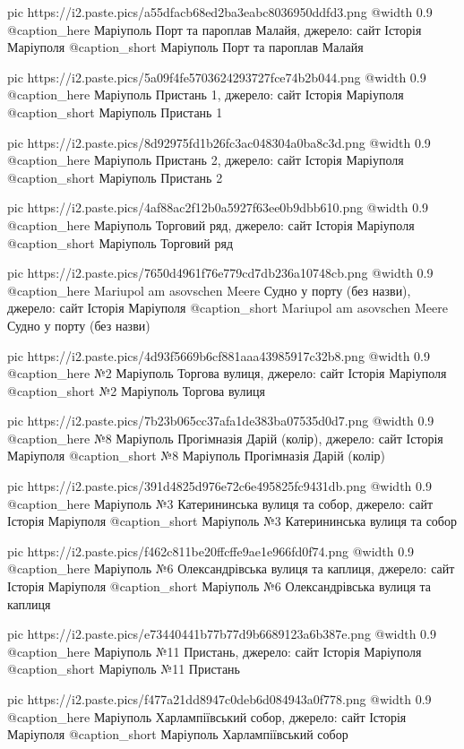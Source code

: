 	pic https://i2.paste.pics/a55dfacb68ed2ba3eabc8036950ddfd3.png
	@width 0.9
	@caption_here Маріуполь Порт та пароплав Малайя, джерело: сайт Історія Маріуполя
	@caption_short Маріуполь Порт та пароплав Малайя

	pic https://i2.paste.pics/5a09f4fe5703624293727fce74b2b044.png
	@width 0.9
	@caption_here Маріуполь Пристань 1, джерело: сайт Історія Маріуполя
	@caption_short Маріуполь Пристань 1

	pic https://i2.paste.pics/8d92975fd1b26fc3ac048304a0ba8c3d.png
	@width 0.9
	@caption_here Маріуполь Пристань 2, джерело: сайт Історія Маріуполя
	@caption_short Маріуполь Пристань 2

	pic https://i2.paste.pics/4af88ac2f12b0a5927f63ee0b9dbb610.png
	@width 0.9
	@caption_here Маріуполь Торговий ряд, джерело: сайт Історія Маріуполя
	@caption_short Маріуполь Торговий ряд

	pic https://i2.paste.pics/7650d4961f76e779cd7db236a10748cb.png
	@width 0.9
	@caption_here Mariupol am asovschen Meere Судно у порту (без назви), джерело: сайт Історія Маріуполя
	@caption_short Mariupol am asovschen Meere Судно у порту (без назви)

	pic https://i2.paste.pics/4d93f5669b6cf881aaa43985917c32b8.png
	@width 0.9
	@caption_here №2 Маріуполь Торгова вулиця, джерело: сайт Історія Маріуполя
	@caption_short №2 Маріуполь Торгова вулиця

	pic https://i2.paste.pics/7b23b065cc37afa1de383ba07535d0d7.png
	@width 0.9
	@caption_here №8 Маріуполь Прогімназія Дарій (колір), джерело: сайт Історія Маріуполя
	@caption_short №8 Маріуполь Прогімназія Дарій (колір)

	pic https://i2.paste.pics/391d4825d976e72c6e495825fc9431db.png
	@width 0.9
	@caption_here Маріуполь №3 Катерининська вулиця та собор, джерело: сайт Історія Маріуполя
	@caption_short Маріуполь №3 Катерининська вулиця та собор

	pic https://i2.paste.pics/f462c811be20ffcffe9ae1e966fd0f74.png
	@width 0.9
	@caption_here Маріуполь №6 Олександрівська вулиця та каплиця, джерело: сайт Історія Маріуполя
	@caption_short Маріуполь №6 Олександрівська вулиця та каплиця

	pic https://i2.paste.pics/e73440441b77b77d9b6689123a6b387e.png
	@width 0.9
	@caption_here Маріуполь №11 Пристань, джерело: сайт Історія Маріуполя
	@caption_short Маріуполь №11 Пристань

	pic https://i2.paste.pics/f477a21dd8947c0deb6d084943a0f778.png
	@width 0.9
	@caption_here Маріуполь Харлампіївський собор, джерело: сайт Історія Маріуполя
	@caption_short Маріуполь Харлампіївський собор

